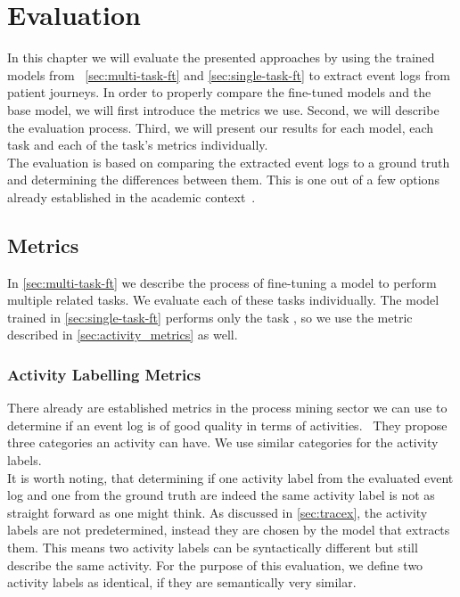 \section{Evaluation}\label{sec:eval}
In this chapter we will evaluate the presented approaches by using the trained models from ~\autoref{sec:multi-task-ft} and \autoref{sec:single-task-ft} to extract event logs from patient journeys. In order to properly compare the fine-tuned models and the base model, we will first introduce the metrics we use. Second, we will describe the evaluation process. Third, we will present our results for each model, each task and each of the task's metrics individually.\\
The evaluation is based on comparing the extracted event logs to a ground truth and determining the differences between them. This is one out of a few options already established in the academic context~\cite{latif_fine-tuning_2024}.

\subsection{Metrics}\label{sec:metrics}
In \autoref{sec:multi-task-ft} we describe the process of fine-tuning a model to perform multiple related tasks. We evaluate each of these tasks individually. The model trained in \autoref{sec:single-task-ft} performs only the task , so we use the metric described in \autoref{sec:activity_metrics} as well.

\subsubsection{Activity Labelling Metrics}\label{sec:activity_metrics}
There already are established metrics in the process mining sector we can use to determine if an event log is of good quality in terms of activities.~\cite{van_der_aalst_process_2016, carmona_conformance_2018} They propose three categories an activity can have. We use similar categories for the activity labels.\\
It is worth noting, that determining if one activity label from the evaluated event log and one from the ground truth are indeed the same activity label is not as straight forward as one might think. As discussed in \autoref{sec:tracex}, the activity labels are not predetermined, instead they are chosen by the model that extracts them. This means two activity labels can be syntactically different but still describe the same activity. For the purpose of this evaluation, we define two activity labels as identical, if they are semantically very similar.
